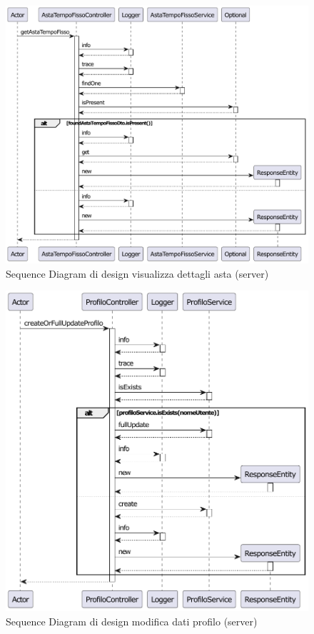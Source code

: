         \begin{figure}[htbp!]
            \centering
                \includegraphics[width=1\linewidth]{Immagini/Diagrammi/Sequence Diagram/Server Sequence Design/ServerSequenceDettagliAstaDesign.pdf}
            \caption{Sequence Diagram di design visualizza dettagli asta (server)}
            \label{fig:Sequence Diagram di design visualizza dettagli asta (server)}
        \end{figure}
        \begin{figure}[htbp!]
            \centering
                \includegraphics[width=1\linewidth]{Immagini/Diagrammi/Sequence Diagram/Server Sequence Design/ServerSequenceModificaProfiloDesign.pdf}
            \caption{Sequence Diagram di design modifica dati profilo (server)}
            \label{fig:Sequence Diagram di design modifica dati profilo (server)}
        \end{figure}
    \clearpage
    
